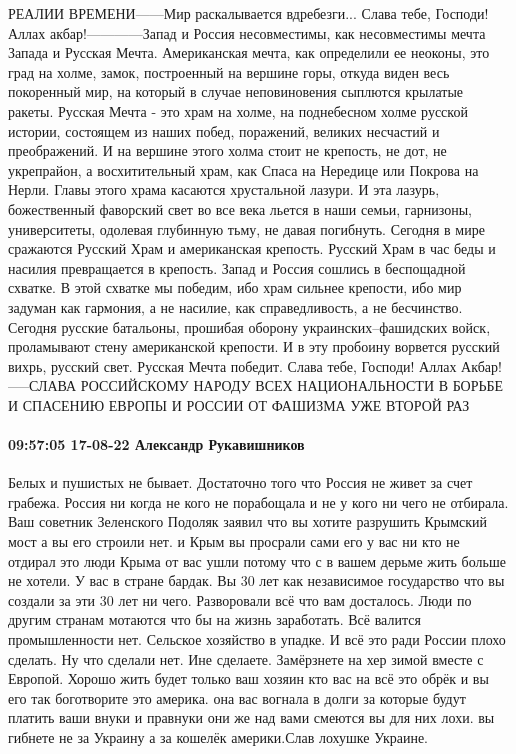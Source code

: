 РЕАЛИИ ВРЕМЕНИ------Мир раскалывается вдребезги... Слава тебе, Господи! Аллах акбар!------------Запад и Россия несовместимы, как несовместимы мечта Запада и Русская
Мечта. Американская мечта, как определили ее неоконы, это град на холме,
замок, построенный на вершине горы, откуда виден весь покоренный мир,
на который в случае неповиновения сыплются крылатые ракеты.
Русская
Мечта - это храм на холме, на поднебесном холме русской истории,
состоящем из наших побед, поражений, великих несчастий и преображений. И
на вершине этого холма стоит не крепость, не дот, не укрепрайон, а
восхитительный храм, как Спаса на Нередице или Покрова на Нерли. Главы
этого храма касаются хрустальной лазури. И эта лазурь, божественный
фаворский свет во все века льется в наши семьи, гарнизоны, университеты,
одолевая глубинную тьму, не давая погибнуть.
Сегодня в мире
сражаются Русский Храм и американская крепость. Русский Храм в час беды и
насилия превращается в крепость. Запад и Россия сошлись в беспощадной
схватке. В этой схватке мы победим, ибо храм сильнее крепости, ибо мир
задуман как гармония, а не насилие, как справедливость, а не бесчинство.
Сегодня
русские батальоны, прошибая оборону украинских--фашидских войск, проламывают стену
американской крепости. И в эту пробоину ворвется русский вихрь, русский
свет. Русская Мечта победит. Слава тебе, Господи! Аллах Акбар!-----СЛАВА РОССИЙСКОМУ НАРОДУ ВСЕХ НАЦИОНАЛЬНОСТИ В БОРЬБЕ И СПАСЕНИЮ ЕВРОПЫ И РОССИИ ОТ ФАШИЗМА УЖЕ ВТОРОЙ РАЗ

\paragraph{09:57:05 17-08-22 Александр Рукавишников}

Белых и пушистых не бывает. Достаточно того что Россия не живет за счет
грабежа. Россия ни когда не кого не порабощала и не у кого ни чего не отбирала.
Ваш советник Зеленского Подоляк заявил что вы хотите разрушить Крымский мост а
вы его строили нет. и Крым вы просрали сами его у вас ни кто не отдирал это
люди Крыма от вас ушли потому что с в вашем дерьме жить больше не хотели. У вас
в стране бардак. Вы 30 лет как независимое государство что вы создали за эти 30
лет ни чего. Разворовали всё что вам досталось. Люди по другим странам мотаются
что бы на жизнь заработать. Всё валится промышленности нет. Сельское хозяйство
в упадке. И всё это ради России плохо сделать. Ну что сделали нет. Ине
сделаете. Замёрзнете на хер зимой вместе с Европой. Хорошо жить будет только
ваш хозяин кто вас на всё это обрёк и вы его так боготворите это америка. она
вас вогнала в долги за которые будут платить ваши внуки и правнуки они же над
вами смеются вы для них лохи. вы гибнете не за Украину а за кошелёк
америки.Слав лохушке Украине.

